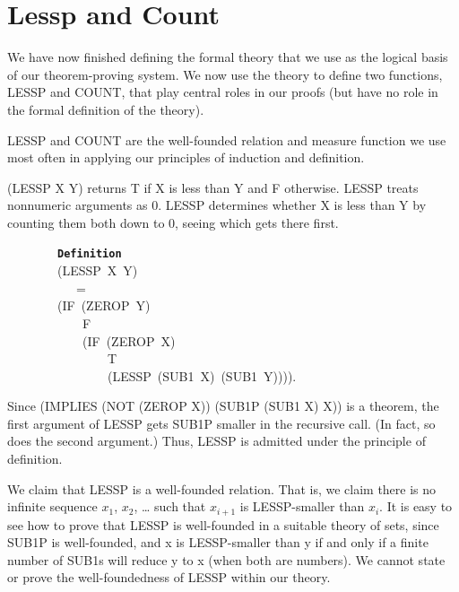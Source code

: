 \documentclass[11pt]{book}
\newenvironment{pubasis}{\begin{flushleft}\ttfamily\small}{\normalsize\rmfamily\end{flushleft}}
\newcommand{\axiomordefinition}[1]{\vspace{6pt}\texttt{\textbf{#1}}}
\newcommand{\pubdefaulttextsize}{\large}
\begin{document}
\section{Lessp and Count}
\label{SSLESSP}
\pubdefaulttextsize
We have now finished defining the formal theory that
we use as the logical basis of our theorem-proving system.
We now  use the theory to define two  functions, LESSP
and COUNT, that play central roles in our proofs (but have
no role in the formal definition of the theory).

LESSP and COUNT are the well-founded relation and measure function we
use most often in applying our principles of induction and definition.

(LESSP X Y) returns T if X is less than Y and F otherwise.  LESSP
treats nonnumeric arguments as 0.  LESSP determines whether X is less
than Y by counting them both down to 0, seeing which gets there first.
\par\pagebreak[0]\hrulefill\nopagebreak\par
\begin{pubasis}
~~~~~~~~\axiomordefinition{Definition}\\
~~~~~~~~(LESSP~X~Y)\\
~~~~~~~~~~~=\\
~~~~~~~~(IF~(ZEROP~Y)\\
~~~~~~~~~~~~F\\
~~~~~~~~~~~~(IF~(ZEROP~X)\\
~~~~~~~~~~~~~~~~T\\
~~~~~~~~~~~~~~~~(LESSP~(SUB1~X)~(SUB1~Y)))).\\
\end{pubasis}
\nopagebreak\par\hrulefill\nopagebreak\par
Since (IMPLIES (NOT (ZEROP X)) (SUB1P (SUB1 X) X)) is a theorem,
the first argument of LESSP gets SUB1P smaller in the recursive call.
(In fact, so does the second argument.)  Thus, LESSP
is admitted under the principle
of definition.

We claim that LESSP is a well-founded relation.  That is, we claim
there is no infinite sequence $x_{1}$, $x_{2}$, \ldots{} such that $x_{i+1}$
is LESSP-smaller than $x_{i}$.  It is easy to see how to
prove that LESSP is well-founded in a suitable theory of sets,
since SUB1P is well-founded, 
and x is LESSP-smaller than y if and only if a finite number of SUB1s will
reduce y to x (when both are numbers).  We cannot state or
prove the well-foundedness of LESSP within our theory.
\end{document}
